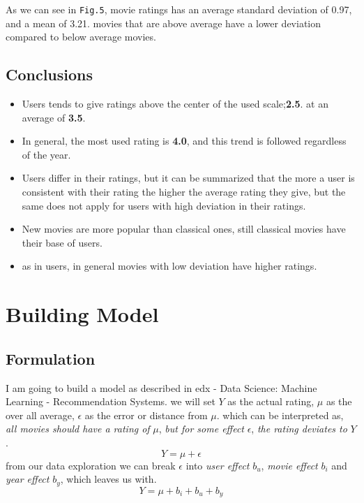 \documentclass[]{article}
\providecommand{\tightlist}{%
  \setlength{\itemsep}{0pt}\setlength{\parskip}{0pt}}
\begin{document}
As we can see in \texttt{Fig.5}, movie ratings has an average standard
deviation of 0.97, and a mean of 3.21. movies that are above average
have a lower deviation compared to below average movies.

\subsection{Conclusions}\label{conclusions}

\begin{itemize}
\tightlist
\item
  Users tends to give ratings above the center of the used
  scale;\textbf{2.5}. at an average of \textbf{3.5}.
\item
  In general, the most used rating is \textbf{4.0}, and this trend is
  followed regardless of the year.
\item
  Users differ in their ratings, but it can be summarized that the more
  a user is consistent with their rating the higher the average rating
  they give, but the same does not apply for users with high deviation
  in their ratings.
\item
  New movies are more popular than classical ones, still classical
  movies have their base of users.
\item
  as in users, in general movies with low deviation have higher ratings.
\end{itemize}

\newpage

\section{Building Model}\label{building-model}

\subsection{Formulation}\label{formulation}

I am going to build a model as described in edx - Data Science: Machine
Learning - Recommendation Systems. we will set \(Y\) as the actual
rating, \(\mu\) as the over all average, \(\epsilon\) as the error or
distance from \(\mu\). which can be interpreted as, \emph{all movies
should have a rating of} \(\mu\), \emph{but for some effect}
\(\epsilon\), \emph{the rating deviates to} \(Y\).
\[Y = \mu + \epsilon \] from our data exploration we can break
\(\epsilon\) into \emph{user effect} \(b_u\), \emph{movie effect}
\(b_i\) and \emph{year effect} \(b_y\), which leaves us with. \[
Y= \mu + b_i + b_u + b_y 
\]
\end{document}
